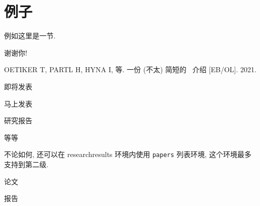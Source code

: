 \documentclass[final]{ncuthesis}
\begin{document}
\section{例子}
例如这里是一节. 
\backmatter

\begin{acknowledgements}
谢谢你! 
\end{acknowledgements}
\begin{researchresults}
\begin{published}
  \item OETIKER T, PARTL H, HYNA I, 等. 一份 (不太) 简短的 \LaTeXe\ 介绍 [EB/OL]. 2021. 
\end{published}
\begin{tobepublished}
  \item 即将发表
  \item 马上发表
\end{tobepublished}
\begin{reports}
  \item 研究报告
\end{reports}
\begin{others}[另外还有]
  \item 等等
\end{others}

不论如何, 还可以在 \textsf{researchresults} 环境内使用 \texttt{papers} 列表环境, 这个环境最多支持到第二级. 
\begin{papers}
  \item 论文
  \item 报告
\end{papers}
\end{researchresults}
\end{document}
